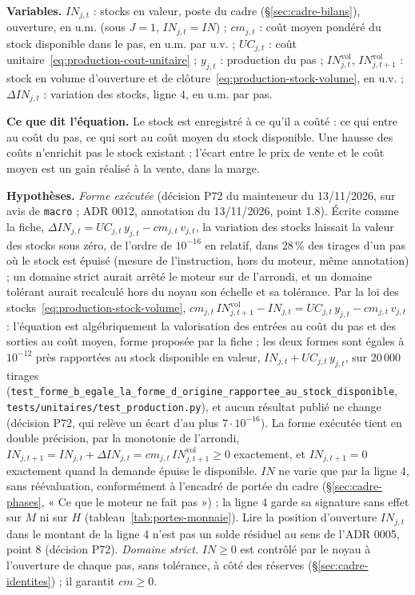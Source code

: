 \documentclass[11pt,a4paper]{article}
\newcommand{\variables}{\par\noindent\textbf{Variables.} }
\newcommand{\sens}{\par\noindent\textbf{Ce que dit l'équation.} }
\newcommand{\hyp}{\par\noindent\textbf{Hypothèses.} }
\begin{document}
\begin{lecture}
\variables $\mathit{IN}_{j,t}$ : stocks en valeur, poste du cadre (\S\ref{sec:cadre-bilans}), ouverture, en u.m. (sous $J = 1$, $\mathit{IN}_{j,t} = \mathit{IN}$) ; $\mathit{cm}_{j,t}$ : coût moyen pondéré du stock disponible dans le pas, en u.m. par u.v. ; $\mathit{UC}_{j,t}$ : coût unitaire~\eqref{eq:production-cout-unitaire} ; $y_{j,t}$ : production du pas ; $\mathit{IN}^{\mathrm{vol}}_{j,t}$, $\mathit{IN}^{\mathrm{vol}}_{j,t+1}$ : stock en volume d'ouverture et de clôture~\eqref{eq:production-stock-volume}, en u.v. ; $\Delta\mathit{IN}_{j,t}$ : variation des stocks, ligne 4, en u.m. par pas.
\sens Le stock est enregistré à ce qu'il a coûté : ce qui entre au coût du pas, ce qui sort au coût moyen du stock disponible. Une hausse des coûts n'enrichit pas le stock existant ; l'écart entre le prix de vente et le coût moyen est un gain réalisé à la vente, dans la marge.
\hyp \emph{Forme exécutée} (décision P72 du mainteneur du 13/11/2026, sur avis de \texttt{macro} ; ADR 0012, annotation du 13/11/2026, point 1.8). Écrite comme la fiche, $\Delta\mathit{IN}_{j,t} = \mathit{UC}_{j,t}\, y_{j,t} - \mathit{cm}_{j,t}\, v_{j,t}$, la variation des stocks laissait la valeur des stocks sous zéro, de l'ordre de $10^{-16}$ en relatif, dans 28\,\% des tirages d'un pas où le stock est épuisé (mesure de l'instruction, hors du moteur, même annotation) ; un domaine strict aurait arrêté le moteur sur de l'arrondi, et un domaine tolérant aurait recalculé hors du noyau son échelle et sa tolérance. Par la loi des stocks~\eqref{eq:production-stock-volume}, $\mathit{cm}_{j,t}\,\mathit{IN}^{\mathrm{vol}}_{j,t+1} - \mathit{IN}_{j,t} = \mathit{UC}_{j,t}\, y_{j,t} - \mathit{cm}_{j,t}\, v_{j,t}$ : l'équation est algébriquement la valorisation des entrées au coût du pas et des sorties au coût moyen, forme proposée par la fiche ; les deux formes sont égales à $10^{-12}$ près rapportées au stock disponible en valeur, $\mathit{IN}_{j,t} + \mathit{UC}_{j,t}\, y_{j,t}$, sur 20\,000 tirages (\nolinkurl{test_forme_b_egale_la_forme_d_origine_rapportee_au_stock_disponible}, \nolinkurl{tests/unitaires/test_production.py}), et aucun résultat publié ne change (décision P72, qui relève un écart d'au plus $7 \cdot 10^{-16}$). La forme exécutée tient en double précision, par la monotonie de l'arrondi, $\mathit{IN}_{j,t+1} = \mathit{IN}_{j,t} + \Delta\mathit{IN}_{j,t} = \mathit{cm}_{j,t}\,\mathit{IN}^{\mathrm{vol}}_{j,t+1} \ge 0$ exactement, et $\mathit{IN}_{j,t+1} = 0$ exactement quand la demande épuise le disponible. $\mathit{IN}$ ne varie que par la ligne 4, sans réévaluation, conformément à l'encadré de portée du cadre (\S\ref{sec:cadre-phases}, « Ce que le moteur ne fait pas ») ; la ligne 4 garde sa signature sans effet sur $M$ ni sur $H$ (tableau~\ref{tab:portes-monnaie}). Lire la position d'ouverture $\mathit{IN}_{j,t}$ dans le montant de la ligne 4 n'est pas un solde résiduel au sens de l'ADR 0005, point 8 (décision P72). \emph{Domaine strict.} $\mathit{IN} \ge 0$ est contrôlé par le noyau à l'ouverture de chaque pas, sans tolérance, à côté des réserves (\S\ref{sec:cadre-identites}) ; il garantit $\mathit{cm} \ge 0$.

\end{lecture}
\end{document}
